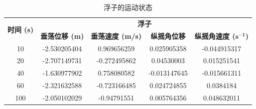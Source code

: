 \documentclass{my_paper}
\begin{document}
\begin{table}[!htbp]
\setlength{\belowcaptionskip}{0.2cm}
\caption{浮子的运动状态}
\centering
\begin{tabular}{|c|cccc|}
\hline
\multirow{2}{*}{\textbf{时间 (s)}} & \multicolumn{4}{c|}{\textbf{浮子}}                                                                                                               \\ \cline{2-5} 
                                 & \multicolumn{1}{c|}{\textbf{垂荡位移 (m)}} & \multicolumn{1}{c|}{\textbf{垂荡速度 (m/s)}} & \multicolumn{1}{c|}{\textbf{纵摇角位移}} & \textbf{纵摇角速度 ($\bm{s^{-1}}$)} \\ \hline
10                               & \multicolumn{1}{c|}{-2.530205404}      & \multicolumn{1}{c|}{0.969656259}         & \multicolumn{1}{c|}{0.025905358}    & -0.044915317         \\ \hline
20                               & \multicolumn{1}{c|}{-2.707149731}      & \multicolumn{1}{c|}{-0.272495862}        & \multicolumn{1}{c|}{0.04530003}     & 0.015251541          \\ \hline
40                               & \multicolumn{1}{c|}{-1.630977902}      & \multicolumn{1}{c|}{0.758080582}         & \multicolumn{1}{c|}{-0.013147645}   & -0.015661311         \\ \hline
60                               & \multicolumn{1}{c|}{-2.321632588}      & \multicolumn{1}{c|}{-0.723166485}        & \multicolumn{1}{c|}{0.024724855}    & 0.0384184            \\ \hline
100                              & \multicolumn{1}{c|}{-2.050102029}      & \multicolumn{1}{c|}{-0.94791551}         & \multicolumn{1}{c|}{0.005764356}    & 0.048632011          \\ \hline
\end{tabular}

\end{table}
\end{document}
